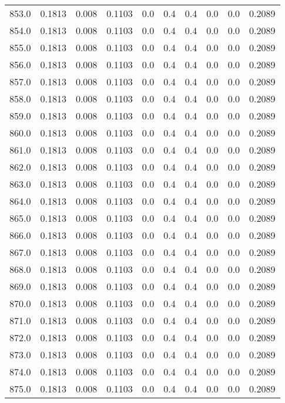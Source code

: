 \begin{longtable}{lrrrrrrrrr}
853.0 & 0.1813 & 0.008 & 0.1103 & 0.0 & 0.4 & 0.4 & 0.0 & 0.0 & 0.2089 \\
854.0 & 0.1813 & 0.008 & 0.1103 & 0.0 & 0.4 & 0.4 & 0.0 & 0.0 & 0.2089 \\
855.0 & 0.1813 & 0.008 & 0.1103 & 0.0 & 0.4 & 0.4 & 0.0 & 0.0 & 0.2089 \\
856.0 & 0.1813 & 0.008 & 0.1103 & 0.0 & 0.4 & 0.4 & 0.0 & 0.0 & 0.2089 \\
857.0 & 0.1813 & 0.008 & 0.1103 & 0.0 & 0.4 & 0.4 & 0.0 & 0.0 & 0.2089 \\
858.0 & 0.1813 & 0.008 & 0.1103 & 0.0 & 0.4 & 0.4 & 0.0 & 0.0 & 0.2089 \\
859.0 & 0.1813 & 0.008 & 0.1103 & 0.0 & 0.4 & 0.4 & 0.0 & 0.0 & 0.2089 \\
860.0 & 0.1813 & 0.008 & 0.1103 & 0.0 & 0.4 & 0.4 & 0.0 & 0.0 & 0.2089 \\
861.0 & 0.1813 & 0.008 & 0.1103 & 0.0 & 0.4 & 0.4 & 0.0 & 0.0 & 0.2089 \\
862.0 & 0.1813 & 0.008 & 0.1103 & 0.0 & 0.4 & 0.4 & 0.0 & 0.0 & 0.2089 \\
863.0 & 0.1813 & 0.008 & 0.1103 & 0.0 & 0.4 & 0.4 & 0.0 & 0.0 & 0.2089 \\
864.0 & 0.1813 & 0.008 & 0.1103 & 0.0 & 0.4 & 0.4 & 0.0 & 0.0 & 0.2089 \\
865.0 & 0.1813 & 0.008 & 0.1103 & 0.0 & 0.4 & 0.4 & 0.0 & 0.0 & 0.2089 \\
866.0 & 0.1813 & 0.008 & 0.1103 & 0.0 & 0.4 & 0.4 & 0.0 & 0.0 & 0.2089 \\
867.0 & 0.1813 & 0.008 & 0.1103 & 0.0 & 0.4 & 0.4 & 0.0 & 0.0 & 0.2089 \\
868.0 & 0.1813 & 0.008 & 0.1103 & 0.0 & 0.4 & 0.4 & 0.0 & 0.0 & 0.2089 \\
869.0 & 0.1813 & 0.008 & 0.1103 & 0.0 & 0.4 & 0.4 & 0.0 & 0.0 & 0.2089 \\
870.0 & 0.1813 & 0.008 & 0.1103 & 0.0 & 0.4 & 0.4 & 0.0 & 0.0 & 0.2089 \\
871.0 & 0.1813 & 0.008 & 0.1103 & 0.0 & 0.4 & 0.4 & 0.0 & 0.0 & 0.2089 \\
872.0 & 0.1813 & 0.008 & 0.1103 & 0.0 & 0.4 & 0.4 & 0.0 & 0.0 & 0.2089 \\
873.0 & 0.1813 & 0.008 & 0.1103 & 0.0 & 0.4 & 0.4 & 0.0 & 0.0 & 0.2089 \\
874.0 & 0.1813 & 0.008 & 0.1103 & 0.0 & 0.4 & 0.4 & 0.0 & 0.0 & 0.2089 \\
875.0 & 0.1813 & 0.008 & 0.1103 & 0.0 & 0.4 & 0.4 & 0.0 & 0.0 & 0.2089 \\

\end{longtable}
